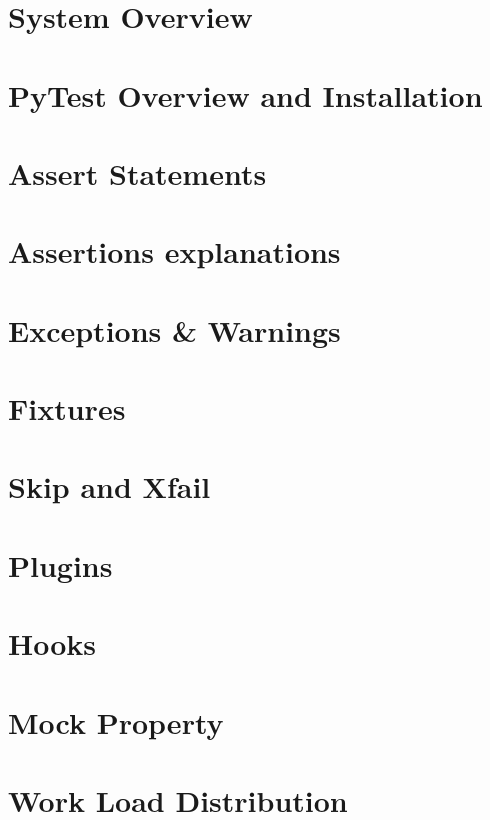 \documentclass[a4paper,12pt]{article}
\begin{document}
    
\section{System Overview}


\section{PyTest Overview and Installation}


\newpage
\section{Assert Statements}


\section{Assertions explanations}
\label{sec:explainations}


\section{Exceptions \& Warnings}
\label{sec:exceptions}


\section{Fixtures}
\label{sec:fixtures}


\section{Skip and Xfail}
\label{sec:skip_xfail}


\section{Plugins}
\label{sec:plugins}


\section{Hooks}
\label{sec:hooks}


\section{Mock Property}
\label{sec:mock}


\section{Work Load Distribution}

 


\nocite{*}
\end{document}
